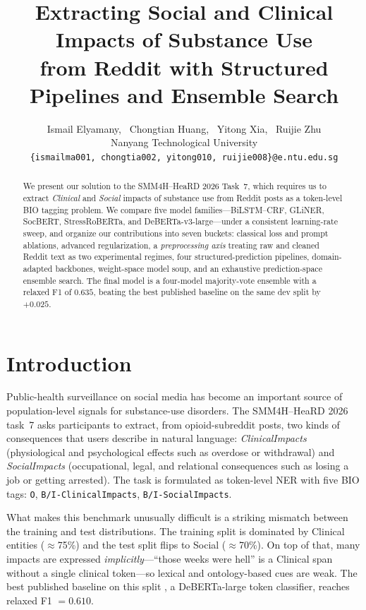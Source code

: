 \documentclass[11pt]{article}
\title{Extracting Social and Clinical Impacts of Substance Use\\
from Reddit with Structured Pipelines and Ensemble Search}
\author{Ismail Elyamany, \ Chongtian Huang, \ Yitong Xia, \ Ruijie Zhu\\
Nanyang Technological University \\
\texttt{\{ismailma001, chongtia002, yitong010, ruijie008\}@e.ntu.edu.sg}
}
\begin{document}
\maketitle

\begin{abstract}
We present our solution to the SMM4H--HeaRD 2026 Task~7,
which requires us to extract \emph{Clinical} and \emph{Social} impacts of
substance use from Reddit posts as a token-level BIO tagging problem. 
We compare five model families---BiLSTM--CRF, GLiNER, SocBERT,
StressRoBERTa, and DeBERTa-v3-large---under a consistent learning-rate
sweep, and organize our contributions into seven buckets: classical loss and
prompt ablations, advanced regularization, a \emph{preprocessing axis}
treating raw and cleaned Reddit text as two experimental regimes,
four structured-prediction pipelines, domain-adapted backbones, weight-space
model soup, and an exhaustive prediction-space ensemble search. 
The final model is a four-model majority-vote ensemble with a relaxed F1 of $ 0.635$, beating the best published baseline on the same dev split by $+0.025$. 
\end{abstract}

\section{Introduction}

Public-health surveillance on social media has become an important source of population-level signals for substance-use disorders. The SMM4H--HeaRD 2026 task~7 asks participants to extract, from opioid-subreddit posts, two kinds of consequences that users describe in natural language: \emph{ClinicalImpacts} (physiological and psychological effects such as overdose or withdrawal) and \emph{SocialImpacts} (occupational, legal, and relational consequences such as losing a job or getting arrested). The task is formulated as token-level NER with five BIO tags: \texttt{O}, \texttt{B/I-ClinicalImpacts}, \texttt{B/I-SocialImpacts}.

What makes this benchmark unusually difficult is a striking mismatch
between the training and test distributions. The training split is
dominated by Clinical entities ($\approx$75\%) and the test split flips
to Social ($\approx$70\%). On top of that, many impacts are expressed
\emph{implicitly}---``those weeks were hell'' is a Clinical span without
a single clinical token---so lexical and ontology-based cues are weak. The
best published baseline on this split \citep{dey2025reddit}, a
DeBERTa-large \citep{he2023debertav3} token classifier, reaches relaxed F1
$= 0.610$.
\end{document}
